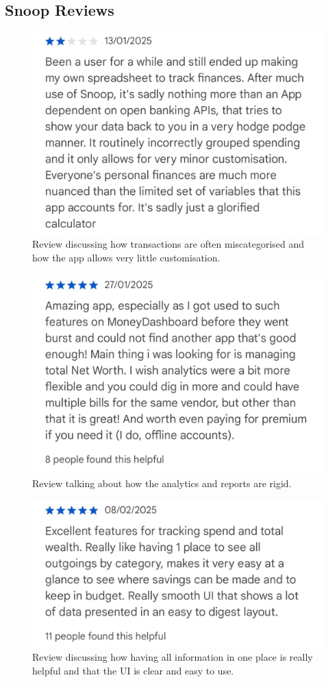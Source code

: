 \documentclass{l4proj}
\begin{document}
\begin{appendices}
\section{Snoop Reviews}
\begin{figure}[H]
    \centering
    \includegraphics[width=0.5\linewidth]{images/App-Comparison/snoop-review-1.png}
    \caption{Review discussing how transactions are often miscategorised and how the app allows very little customisation.}
    \label{fig:enter-label}
\end{figure}
\begin{figure}[H]
    \centering
    \includegraphics[width=0.5\linewidth]{images/App-Comparison/snoop-review-2.png}
    \caption{Review talking about how the analytics and reports are rigid.}
    \label{fig:enter-label}
\end{figure}
\begin{figure}[H]
    \centering
    \includegraphics[width=0.5\linewidth]{images/App-Comparison/snoop-review-3.png}
    \caption{Review discussing how having all information in one place is really helpful and that the UI is clear and easy to use.}
    \label{fig:enter-label}
\end{figure}


\end{appendices}
\end{document}
